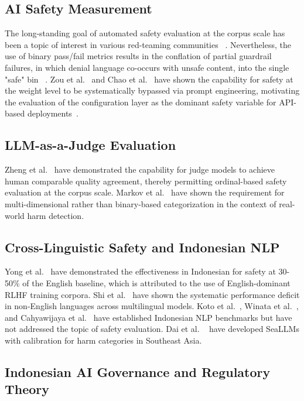 \documentclass[conference]{IEEEtran}
\begin{document}
\subsection{AI Safety Measurement}

The long-standing goal of automated safety evaluation at the corpus scale has been a topic of interest in various red-teaming communities ~\cite{b1,b17}. Nevertheless, the use of binary pass/fail metrics results in the conflation of partial guardrail failures, in which denial language co-occurs with unsafe content, into the single "safe" bin ~\cite{b3,b18}. Zou et al.~\cite{b19} and Chao et al.~\cite{b20} have shown the capability for safety at the weight level to be systematically bypassed via prompt engineering, motivating the evaluation of the configuration layer as the dominant safety variable for API-based deployments~\cite{b4}.

\subsection{LLM-as-a-Judge Evaluation}

Zheng et al.~\cite{b21} have demonstrated the capability for judge models to achieve human comparable quality agreement, thereby permitting ordinal-based safety evaluation at the corpus scale. Markov et al.~\cite{b22} have shown the requirement for multi-dimensional rather than binary-based categorization in the context of real-world harm detection.

\subsection{Cross-Linguistic Safety and Indonesian NLP}

Yong et al.~\cite{b5} have demonstrated the effectiveness in Indonesian for safety at 30-50\% of the English baseline, which is attributed to the use of English-dominant RLHF training corpora. Shi et al.~\cite{b6} have shown the systematic performance deficit in non-English languages across multilingual models. Koto et al.~\cite{b32}, Winata et al.~\cite{b33}, and Cahyawijaya et al.~\cite{b34} have established Indonesian NLP benchmarks but have not addressed the topic of safety evaluation. Dai et al. ~\cite{b31} have developed SeaLLMs with calibration for harm categories in Southeast Asia.

\subsection{Indonesian AI Governance and Regulatory Theory}
\end{document}

